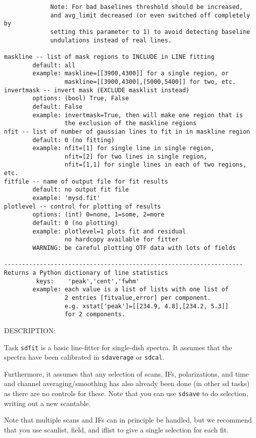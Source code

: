 \begin{verbatim}
             Note: For bad baselines threshold should be increased,
             and avg_limit decreased (or even switched off completely by
             setting this parameter to 1) to avoid detecting baseline
             undulations instead of real lines.

maskline -- list of mask regions to INCLUDE in LINE fitting
        default: all
        example: maskline=[[3900,4300]] for a single region, or
                 maskline=[[3900,4300],[5000,5400]] for two, etc.
invertmask -- invert mask (EXCLUDE masklist instead)
        options: (bool) True, False
        default: False
        example: invertmask=True, then will make one region that is
                 the exclusion of the maskline regions
nfit -- list of number of gaussian lines to fit in in maskline region
        default: 0 (no fitting)
        example: nfit=[1] for single line in single region,
                 nfit=[2] for two lines in single region,
                 nfit=[1,1] for single lines in each of two regions, etc.
fitfile -- name of output file for fit results
        default: no output fit file
        example: 'mysd.fit'
plotlevel -- control for plotting of results
        options: (int) 0=none, 1=some, 2=more
        default: 0 (no plotting)
        example: plotlevel=1 plots fit and residual
                 no hardcopy available for fitter
        WARNING: be careful plotting OTF data with lots of fields

-------------------------------------------------------------------
Returns a Python dictionary of line statistics
         keys:    'peak','cent','fwhm'
        example: each value is a list of lists with one list of
                 2 entries [fitvalue,error] per component.
                 e.g. xstat['peak']=[[234.9, 4.8],[234.2, 5.3]]
                 for 2 components.
\end{verbatim}

    DESCRIPTION:

    Task {\tt sdfit} is a basic line-fitter for single-dish spectra.
    It assumes that the spectra have been calibrated in {\tt sdaverage}
    or {\tt sdcal}.

    Furthermore, it assumes that any selection of scans, IFs,
    polarizations, and time and channel averaging/smoothing has
    also already been done (in other sd tasks) as there are no controls
    for these.  Note that you can use {\tt sdsave} to do selection, writing
    out a new scantable.

    Note that multiple scans and IFs can in principle be handled, but
    we recommend that you use scanlist, field, and iflist to give a
    single selection for each fit.

